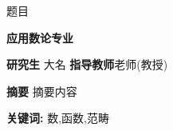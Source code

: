 \clearpage{}
{}

    \centerline{题目}
\begin{center}
    {\textbf{应用数论专业}}
\end{center}

\begin{center}
    \hspace{1cm} \textbf{研究生} \quad 大名 \hspace{1.5cm} \textbf{指导教师}\quad 老师(教授)
\end{center}

\vskip 10bp
{
\hspace{5bp}\textbf{摘要}
摘要内容

\vskip 10bp

\hspace{5bp}\textbf{关键词:}
\quad 数,函数,范畴

}

